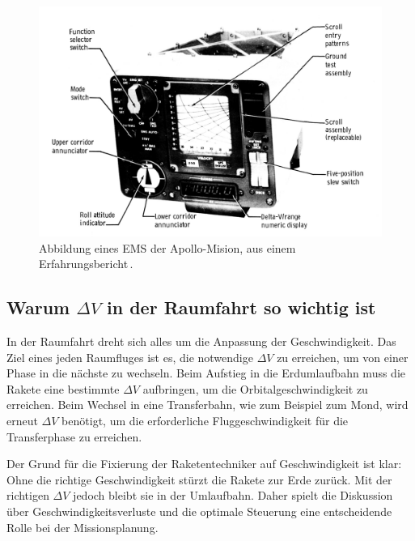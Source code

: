 \begin{figure}
	\centering
	\includegraphics[width=\linewidth]{papers/leo/Grafiken/EMS.png}
	\caption{Abbildung eines EMS der Apollo-Mision, aus einem Erfahrungsbericht\,\cite{wilson1976apollo}.}
	\label{fig:leo:ems}
\end{figure}


\subsection{Warum \(\Delta V\) in der Raumfahrt so wichtig ist}
In der Raumfahrt dreht sich alles um die Anpassung der Geschwindigkeit. 
Das Ziel eines jeden Raumfluges ist es, die notwendige \(\Delta V\) zu erreichen, um von einer Phase in die nächste zu wechseln. 
Beim Aufstieg in die Erdumlaufbahn muss die Rakete eine bestimmte \(\Delta V\) aufbringen, um die Orbitalgeschwindigkeit zu erreichen. 
Beim Wechsel in eine Transferbahn, wie zum Beispiel zum Mond, wird erneut \(\Delta V\) benötigt, um die erforderliche Fluggeschwindigkeit für die Transferphase zu erreichen.

Der Grund für die Fixierung der Raketentechniker auf Geschwindigkeit ist klar: Ohne die richtige Geschwindigkeit stürzt die Rakete zur Erde zurück. 
Mit der richtigen \(\Delta V\) jedoch bleibt sie in der Umlaufbahn. Daher spielt die Diskussion über Geschwindigkeitsverluste und die optimale Steuerung eine entscheidende Rolle bei der Missionsplanung.

